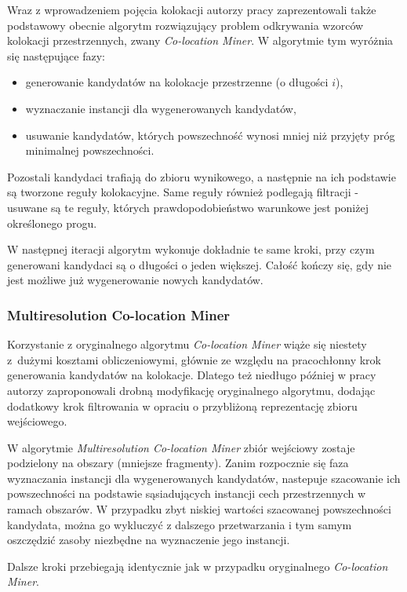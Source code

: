 \documentclass[12pt]{article}
\begin{document}
Wraz z wprowadzeniem pojęcia kolokacji autorzy pracy \cite{huang} zaprezentowali także podstawowy obecnie algorytm rozwiązujący problem odkrywania wzorców kolokacji przestrzennych, zwany \textit{Co-location Miner}. W algorytmie tym wyróżnia się następujące fazy:

\begin{itemize}
\item generowanie kandydatów na kolokacje przestrzenne (o długości $i$),
\item wyznaczanie instancji dla wygenerowanych kandydatów,
\item usuwanie kandydatów, których powszechność wynosi mniej niż przyjęty próg minimalnej powszechności.
\end{itemize}

Pozostali kandydaci trafiają do zbioru wynikowego, a następnie na ich podstawie są tworzone reguły kolokacyjne. Same reguły również podlegają filtracji - usuwane są te reguły, których prawdopodobieństwo warunkowe jest poniżej określonego progu. 

W następnej iteracji algorytm wykonuje dokładnie te same kroki, przy czym generowani kandydaci są o długości o jeden większej. Całość kończy się, gdy nie jest możliwe już wygenerowanie nowych kandydatów.

\subsubsection{Multiresolution Co-location Miner}

Korzystanie z oryginalnego algorytmu \textit{Co-location Miner} wiąże się niestety z~dużymi kosztami obliczeniowymi, głównie ze względu na pracochłonny krok generowania kandydatów na kolokacje. Dlatego też niedługo później w pracy \cite{multihuang} autorzy zaproponowali drobną modyfikację oryginalnego algorytmu, dodając dodatkowy krok filtrowania w opraciu o przybliżoną reprezentację zbioru wejściowego.

W algorytmie \textit{Multiresolution Co-location Miner} zbiór wejściowy zostaje podzielony na obszary (mniejsze fragmenty). Zanim rozpocznie się faza wyznaczania instancji dla wygenerowanych kandydatów, nastepuje szacowanie ich powszechności na podstawie sąsiadujących instancji cech przestrzennych w ramach obszarów. W przypadku zbyt niskiej wartości szacowanej powszechności kandydata, można go wykluczyć z dalszego przetwarzania i tym samym oszczędzić zasoby niezbędne na wyznaczenie jego instancji.

Dalsze kroki przebiegają identycznie jak w przypadku oryginalnego \textit{Co-location Miner}.
\end{document}
